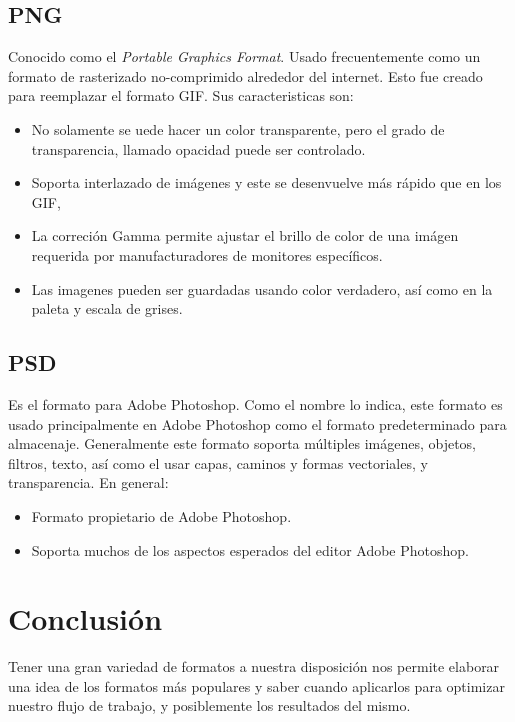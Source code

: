 \documentclass[letterpaper, 12pt]{article}
\begin{document}
    \subsection*{PNG}
    Conocido como el \emph{Portable Graphics Format}. Usado frecuentemente como un formato de rasterizado no-comprimido alrededor del internet. Esto fue creado para reemplazar el formato GIF. Sus caracteristicas son:
    \begin{itemize}
        \item No solamente se uede hacer un color transparente, pero el grado de transparencia, llamado opacidad puede ser controlado.
        \item Soporta interlazado de imágenes y este se desenvuelve más rápido que en los GIF,
        \item La correción Gamma permite ajustar el brillo de color de una imágen  requerida por manufacturadores de monitores específicos.
        \item Las imagenes pueden ser guardadas usando color verdadero, así como en la paleta y escala de grises.
    \end{itemize}\par
    \vspace{\baselineskip}
    \subsection*{PSD}
    Es el formato para Adobe Photoshop. Como el nombre lo indica, este formato es usado principalmente en Adobe Photoshop como el formato predeterminado para almacenaje. Generalmente
    este formato soporta múltiples imágenes, objetos, filtros, texto, así como el usar capas, caminos y formas vectoriales, y transparencia. En general:
    \begin{itemize}
        \item Formato propietario de Adobe Photoshop.
        \item Soporta muchos de los aspectos esperados del editor Adobe Photoshop.
    \end{itemize}\par
    \vspace{\baselineskip}
    \section*{Conclusión}
    Tener una gran variedad de formatos a nuestra disposición nos permite elaborar una idea de los formatos más populares y saber cuando aplicarlos para optimizar nuestro flujo de trabajo, y posiblemente los resultados del mismo.\par
    \vspace{\baselineskip}
    
    \newpage
        \thispagestyle{empty}
        \printbibliography  
\end{document}
